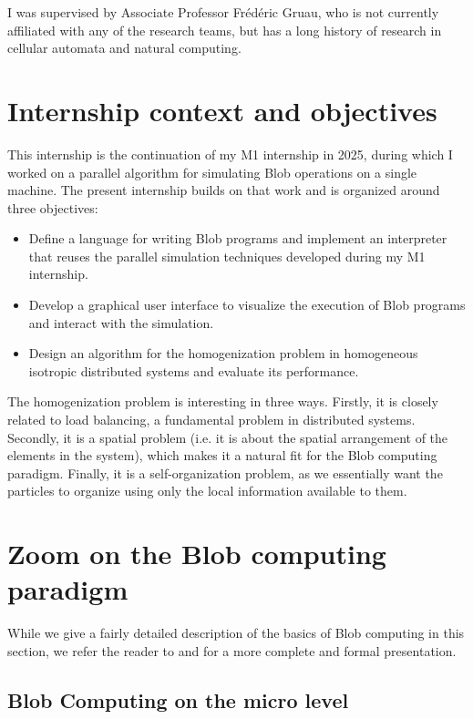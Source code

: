 \documentclass[11pt,a4paper]{report}
\begin{document}
I was supervised by Associate Professor Frédéric Gruau, who is not currently affiliated with any of the research teams, but has a long history of research in cellular automata and natural computing.

\section{Internship context and objectives}

This internship is the continuation of my M1 internship in 2025, during which I worked on a parallel algorithm for simulating Blob operations on a single machine. The present internship builds on that work and is organized around three objectives:

\begin{itemize}
    \item Define a language for writing Blob programs and implement an interpreter that reuses the parallel simulation techniques developed during my M1 internship.
    \item Develop a graphical user interface to visualize the execution of Blob programs and interact with the simulation.
    \item Design an algorithm for the homogenization problem in homogeneous isotropic distributed systems and evaluate its performance.
\end{itemize}

The homogenization problem is interesting in three ways. Firstly, it is closely related to load balancing, a fundamental problem in distributed systems. Secondly, it is a spatial problem (i.e. it is about the spatial arrangement of the elements in the system), which makes it a natural fit for the Blob computing paradigm. Finally, it is a self-organization problem, as we essentially want the particles to organize using only the local information available to them.

\section{Zoom on the Blob computing paradigm}

While we give a fairly detailed description of the basics of Blob computing in this section, we refer the reader to \cite{sdn} and \cite{spatialtypes} for a more complete and formal presentation.

\subsection{Blob Computing on the micro level}
\end{document}

